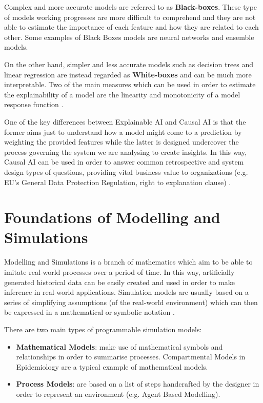 Complex and more accurate models are referred to as \textbf{Black-boxes}. These type of models working progresses are more difficult to comprehend and they are not able to estimate the importance of each feature and how they are related to each other. Some examples of Black Boxes models are neural networks and ensemble models.

On the other hand, simpler and less accurate models such as decision trees and linear regression are instead regarded as \textbf{White-boxes} and can be much more interpretable. Two of the main measures which can be used in order to estimate the explainability of a model are the linearity and monotonicity of a model response function \cite{nove}.

One of the key differences between Explainable AI and Causal AI is that the former aims just to understand how a model might come to a prediction by weighting the provided features while the latter is designed undercover the process governing the system we are analysing to create insights. In this way, Causal AI can be used in order to answer common retrospective and system design types of questions, providing vital business value to organizations (e.g. EU’s General Data Protection Regulation, right to explanation clause) \cite{causalens}.

\section{Foundations of Modelling and Simulations}
Modelling and Simulations is a branch of mathematics which aim to be able to imitate real-world processes over a period of time. In this way, artificially generated historical data can be easily created and used in order to make inference in real-world applications. Simulation models are usually based on a series of simplifying assumptions (of the real-world environment) which can then be expressed in a mathematical or symbolic notation \cite{mod_1}. 

There are two main types of programmable simulation models:
\begin{itemize}
    \item \textbf{Mathematical Models}: make use of mathematical symbols and relationships in order to summarise processes. Compartmental Models in Epidemiology are a typical example of mathematical models.
    \item \textbf{Process Models}: are based on a list of steps handcrafted by the designer in order to represent an environment (e.g. Agent Based Modelling).
\end{itemize}

